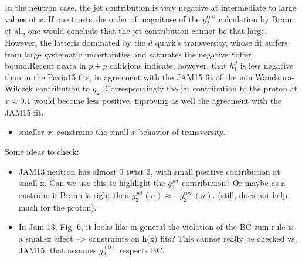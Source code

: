 \documentclass[preprintnumbers,floatfix,nofootinbib]{revtex4}
\begin{document}
In the neutron case, the jet contribution is very negative at intermediate to
large values of $x$. If one trusts the order of magnituse of the $g_2^{tw3}$
calculation by Braun et al., one would conclude that the jet contribution
cannot be that large. However, the latteris dominated by the $d$ quark's
transversity, whose fit suffers from large systematic uncertainties and
saturates the negative Soffer bound.Recent deata in $p+p$ collisions indicate,
however, that $h_1^d$ is less negative than in the Pavia15 fits, in agreement
with the JAM15 fit of the non Wandzura-Wilczek contribution to
$g_2$. Correspondingly the jet contribution to the proton at $x \approx 0.1$
would become less positive, inproving as well the agreement with the JAM15
fit. 


\begin{itemize}
\item smaller-$x$: constrains the small-$x$ behavior of transversity.
\end{itemize}
Some ideas to check:
\begin{itemize}
\item JAM13 neutron has almost 0 twist 3, with small positive contribution at
  small x. Can we use this to highlight the $g_2^{jet}$ contribution? Or maybe
  as a cnstrain: if Braun is right then $g_2^{jet}(n) \approx
  -g_2^{tw3}(n)$. (still, does not help much for the proton). 
\item In Jam 13, Fig. 6, it looks like in general the violation of the BC sum
  rule is a small-x effect --> constraints on h(x) fits? This cannot really be
  checked vs. JAM15, that assumes $g_2^(0)$ respects BC.  
\end{itemize}
\end{document}

